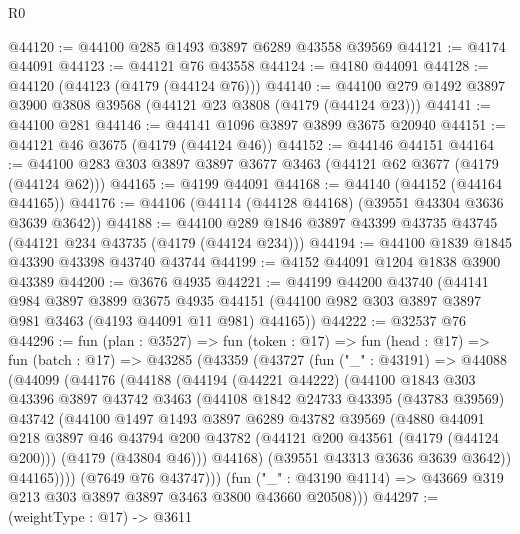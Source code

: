 \begin{lexlean}{R0}
\begin{coremodule}
@44120 := @44100 @285 @1493 @3897 @6289 @43558 @39569
@44121 := @4174 @44091
@44123 := @44121 @76 @43558
@44124 := @4180 @44091
@44128 := @44120 (@44123 (@4179 (@44124 @76)))
@44140 := @44100 @279 @1492 @3897 @3900 @3808 @39568 (@44121 @23 @3808 (@4179 (@44124 @23)))
@44141 := @44100 @281
@44146 := @44141 @1096 @3897 @3899 @3675 @20940
@44151 := @44121 @46 @3675 (@4179 (@44124 @46))
@44152 := @44146 @44151
@44164 := @44100 @283 @303 @3897 @3897 @3677 @3463 (@44121 @62 @3677 (@4179 (@44124 @62)))
@44165 := @4199 @44091
@44168 := @44140 (@44152 (@44164 @44165))
@44176 := @44106 (@44114 (@44128 @44168) (@39551 @43304 @3636 @3639 @3642))
@44188 := @44100 @289 @1846 @3897 @43399 @43735 @43745 (@44121 @234 @43735 (@4179 (@44124 @234)))
@44194 := @44100 @1839 @1845 @43390 @43398 @43740 @43744
@44199 := @4152 @44091 @1204 @1838 @3900 @43389
@44200 := @3676 @4935
@44221 := @44199
    @44200
    @43740
    (@44141
      @984
      @3897
      @3899
      @3675
      @4935
      @44151
      (@44100 @982 @303 @3897 @3897 @981 @3463 (@4193 @44091 @11 @981) @44165))
@44222 := @32537 @76
@44296 := fun (plan : @3527) =>
  fun (token : @17) =>
  fun (head : @17) =>
  fun (batch : @17) =>
  @43285
    (@43359
      (@43727
        (fun ("_" : @43191) =>
        @44088
          (@44099
            (@44176
              (@44188
                (@44194
                  (@44221 @44222)
                  (@44100
                    @1843
                    @303
                    @43396
                    @3897
                    @43742
                    @3463
                    (@44108
                      @1842
                      @24733
                      @43395
                      (@43783 @39569)
                      @43742
                      (@44100
                        @1497
                        @1493
                        @3897
                        @6289
                        @43782
                        @39569
                        (@4880
                          @44091
                          @218
                          @3897
                          @46
                          @43794
                          @200
                          @43782
                          (@44121 @200 @43561 (@4179 (@44124 @200)))
                          (@4179 (@43804 @46)))
                        @44168)
                      (@39551 @43313 @3636 @3639 @3642))
                    @44165))))
            (@7649 @76 @43747)))
        (fun ("_" : @43190 @4114) => @43669 @319 @213 @303 @3897 @3897 @3463 @3800 @43660 @20508)))
@44297 := (weightType : @17) -> @3611

\end{coremodule}
\end{lexlean}
